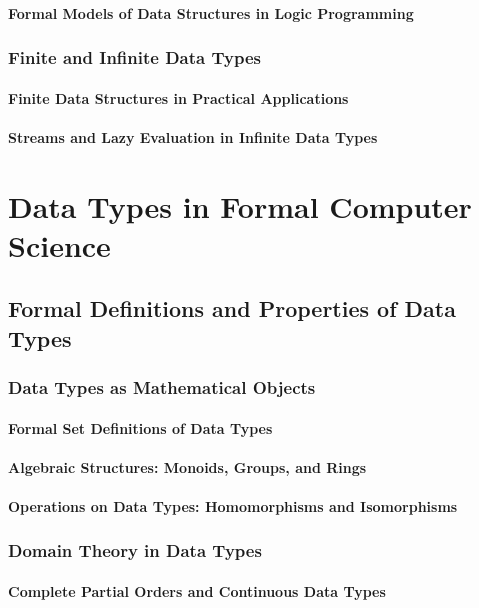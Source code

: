 \documentclass[12pt, oneside]{book}
\begin{document}
\subsubsection{Formal Models of Data Structures in Logic Programming}
\subsection{Finite and Infinite Data Types}
\subsubsection{Finite Data Structures in Practical Applications}
\subsubsection{Streams and Lazy Evaluation in Infinite Data Types}

\chapter{Data Types in Formal Computer Science}
\section{Formal Definitions and Properties of Data Types}
\subsection{Data Types as Mathematical Objects}
\subsubsection{Formal Set Definitions of Data Types}
\subsubsection{Algebraic Structures: Monoids, Groups, and Rings}
\subsubsection{Operations on Data Types: Homomorphisms and Isomorphisms}
\subsection{Domain Theory in Data Types}
\subsubsection{Complete Partial Orders and Continuous Data Types}
\end{document}
